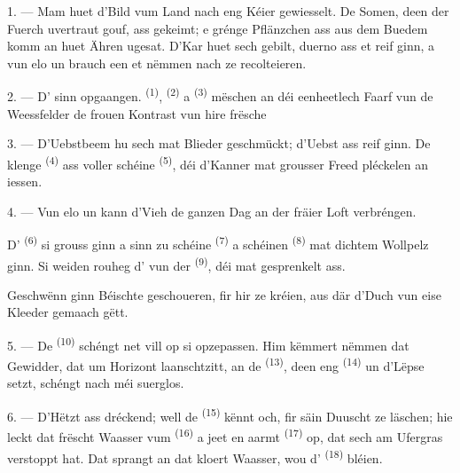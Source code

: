 \VUsaut{5.0mm}
\VUsaut{3.0mm}
\VUsaut{3.0mm}
\VUsaut{4.0mm}
\VUsaut{3.0mm}

1. --- Mam  huet d'Bild vum Land nach eng Kéier gewiesselt. De Somen,
deen der Fuerch uvertraut gouf, ass gekeimt; e grénge Pflänzchen ass aus dem Buedem
komm an huet Ähren ugesat. D'Kar huet sech gebilt, duerno ass et reif ginn, a vun
elo un brauch een et nëmmen nach ze recolteieren.

2. --- D' sinn opgaangen. 
\textsuperscript{(1)},  \textsuperscript{(2)} a
 \textsuperscript{(3)} mëschen an déi eenheetlech Faarf vun de
Weessfelder de frouen Kontrast vun hire frësche 

3. --- D'Uebstbeem hu sech mat Blieder geschmückt; d'Uebst ass reif ginn. De klenge
 \textsuperscript{(4)} ass voller schéine 
\textsuperscript{(5)}, déi d'Kanner mat grousser Freed pléckelen an iessen.

4. --- Vun elo un kann d'Vieh de ganzen Dag an der fräier Loft verbréngen.

D' \textsuperscript{(6)} si grouss ginn a sinn zu schéine
 \textsuperscript{(7)} a schéinen 
\textsuperscript{(8)} mat dichtem Wollpelz ginn. Si weiden rouheg d' vun
der  \textsuperscript{(9)}, déi mat  gesprenkelt
ass.

Geschwënn ginn  Béischte geschoueren, fir hir  ze kréien,
aus där d'Duch vun eise Kleeder gemaach gëtt.

\VUsaut{5.0mm}
\VUsaut{3.4mm}

5. --- De  \textsuperscript{(10)} schéngt net vill op si opzepassen.
Him këmmert nëmmen dat Gewidder, dat um Horizont laanschtzitt, an de
 \textsuperscript{(13)}, deen eng 
\textsuperscript{(14)} un d'Lëpse setzt, schéngt nach méi suerglos.

6. --- D'Hëtzt ass dréckend; well de  \textsuperscript{(15)} kënnt och,
fir säin Duuscht ze läschen; hie leckt dat frëscht Waasser vum 
\textsuperscript{(16)} a jeet en aarmt  \textsuperscript{(17)}
op, dat sech am Ufergras verstoppt hat. Dat sprangt an dat kloert Waasser, wou
d' \textsuperscript{(18)} bléien.

